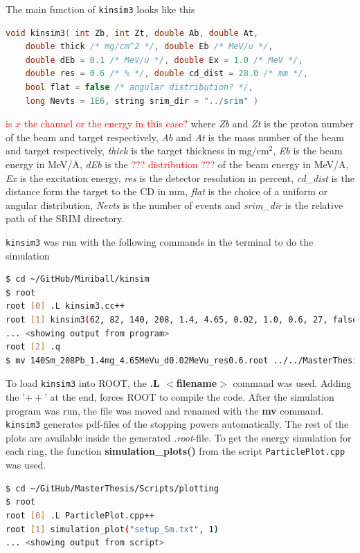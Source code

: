 \documentclass[twoside,english]{uiofysmaster/uiofysmaster}
\begin{document}
The main function of \texttt{kinsim3} looks like this
\begin{lstlisting}[language=c++]
void kinsim3( int Zb, int Zt, double Ab, double At, 
	double thick /* mg/cm^2 */, double Eb /* MeV/u */, 
	double dEb = 0.1 /* MeV/u */, double Ex = 1.0 /* MeV */, 
	double res = 0.6 /* % */, double cd_dist = 28.0 /* mm */, 
	bool flat = false /* angular distribution? */, 
	long Nevts = 1E6, string srim_dir = "../srim" )
\end{lstlisting}
\textcolor{red}{is $x$ the channel or the energy in this case?} \newline
where \textit{Zb} and \textit{Zt} is the proton number of the beam and target respectively, \textit{Ab} and \textit{At} is the mass number of the beam and target respectively, \textit{thick} is the target thickness in mg/cm$^2$, \textit{Eb} is the beam energy in MeV/A, \textit{dEb} is the \textcolor{red}{??? distribution ???} of the beam energy in MeV/A, \textit{Ex} is the excitation energy, \textit{res} is the detector resolution in percent, \textit{cd\_dist} is the distance form the target to the CD in mm, \textit{flat} is the choice of a uniform or angular distribution, \textit{Nevts} is the number of events and \textit{srim\_dir} is the relative path of the SRIM directory.

\texttt{kinsim3} was run with the following commands in the terminal to do the simulation
\begin{lstlisting}[language=sh]
$ cd ~/GitHub/Miniball/kinsim
$ root
root [0] .L kinsim3.cc++
root [1] kinsim3(62, 82, 140, 208, 1.4, 4.65, 0.02, 1.0, 0.6, 27, false, 1e6, "../SRIM")
... <showing output from program>
root [2] .q
$ mv 140Sm_208Pb_1.4mg_4.65MeVu_d0.02MeVu_res0.6.root ../../MasterThesis/Sorted_data/sim_140Sm_208Pb.root
\end{lstlisting}
To load \texttt{kinsim3} into ROOT, the \textbf{.L $<$filename$>$} command was used. Adding the '$++$' at the end, forces ROOT to compile the code. 
After the simulation program was run, the file was moved and renamed with the \textbf{mv} command. 
\texttt{kinsim3} generates pdf-files of the stopping powers automatically. 
The rest of the plots are available inside the generated \textit{.root}-file. 
To get the energy simulation for each ring, the function \textbf{simulation\_plots()} from the script \texttt{ParticlePlot.cpp} was used. 
\begin{lstlisting}[language=sh]
$ cd ~/GitHub/MasterThesis/Scripts/plotting
$ root
root [0] .L ParticlePlot.cpp++
root [1] simulation_plot("setup_Sm.txt", 1)
... <showing output from script>
\end{lstlisting}
\end{document}
